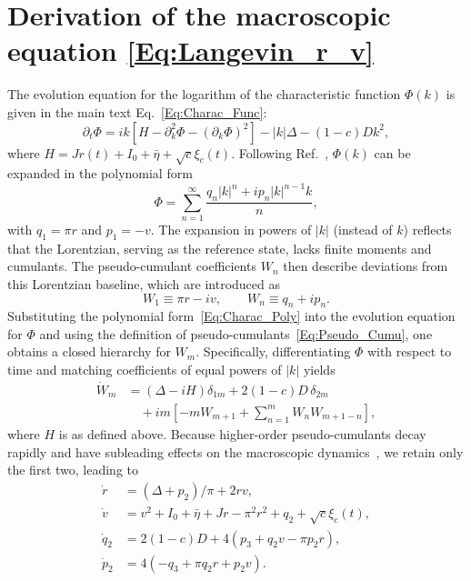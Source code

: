 \documentclass[aps,twocolumn,pre]{revtex4-2}
\begin{document}
\appendix
\section{Derivation of the macroscopic equation \eqref{Eq:Langevin_r_v}}
\label{Appendix}
The evolution equation for the logarithm of the characteristic function $\Phi(k)$ is given in the main text Eq.~\eqref{Eq:Charac_Func}:
\begin{equation}
    \partial_t\Phi = ik[H - \partial_k^2\Phi - (\partial_k\Phi)^2] - |k|\Delta - (1-c)Dk^2,
\end{equation}
where $H = J r(t) + I_0 + \bar{\eta} + \sqrt{c}\xi_c(t)$.
Following Ref.~\cite{goldobin2021reduction}, $\Phi(k)$ can be expanded in the polynomial form
\begin{equation}
    \Phi = \sum_{n=1}^{\infty} \frac{q_n |k|^n + i p_n |k|^{n-1} k}{n},
    \label{Eq:Charac_Poly}
\end{equation}
with $q_1 = \pi r$ and $p_1 = -v$. 
The expansion in powers of $|k|$ (instead of $k$) reflects that the Lorentzian, serving as the reference state, lacks finite moments and cumulants. The pseudo-cumulant coefficients $W_n$ then describe deviations from this Lorentzian baseline, which are introduced as~\cite{goldobin2021reduction}
\begin{equation}
    W_1 \equiv \pi r - i v, \qquad W_n \equiv q_n + i p_n.
    \label{Eq:Pseudo_Cumu}
\end{equation}
Substituting the polynomial form~\eqref{Eq:Charac_Poly} into the evolution equation for $\Phi$ and using the definition of pseudo-cumulants~\eqref{Eq:Pseudo_Cumu}, one obtains a closed hierarchy for $W_m$. 
Specifically, differentiating $\Phi$ with respect to time and matching coefficients of equal powers of $|k|$ yields
\begin{align}
    \dot{W}_m &= (\Delta - i H)\delta_{1m} + 2(1-c)D\,\delta_{2m} \nonumber \\
    &\quad + i m \!\left[ -m W_{m+1} + \sum_{n=1}^{m} W_n W_{m+1-n} \right],
    \label{Eq:Evol_Cumu}
\end{align}
where $H$ is as defined above. 
Because higher-order pseudo-cumulants decay rapidly and have subleading effects on the macroscopic dynamics~\cite{goldobin2021reduction}, we retain only the first two, leading to
\begin{subequations}
\begin{align}
    \dot{r} &= (\Delta + p_2)/\pi + 2 r v, \label{Eq:rvqp_r} \\
    \dot{v} &= v^2+I_0 + \bar{\eta} + J r - \pi^2 r^2 + q_2 + \sqrt{c}\xi_c(t), \label{Eq:rvqp_v} \\
    \dot{q}_2 &= 2(1-c)D + 4 (p_3 + q_2 v - \pi p_2 r), \label{Eq:rvqp_q} \\
    \dot{p}_2 &= 4 (-q_3 + \pi q_2 r + p_2 v). \label{Eq:rvqp_p}
\end{align}
\end{subequations}
\end{document}
